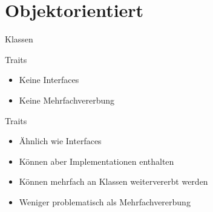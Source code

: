 \section{Objektorientiert}

\begin{frame}[fragile]{Klassen}


\lstset{float=ht,language=scala}


\end{frame}

\begin{frame}[t]{Traits}

\begin{itemize}[<+->]
\item Keine Interfaces
\item Keine Mehrfachvererbung
\end{itemize}

\end{frame}

\begin{frame}[t]{Traits}

\begin{itemize}[<+->]
\item Ähnlich wie Interfaces
\item Können aber Implementationen enthalten
\item Können mehrfach an Klassen weitervererbt werden
\item Weniger problematisch als Mehrfachvererbung
\end{itemize}

\end{frame}
